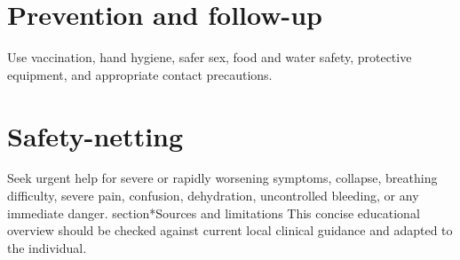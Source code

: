 \section*{Prevention and follow-up}
Use vaccination, hand hygiene, safer sex, food and water safety, protective equipment, and appropriate contact precautions.
\section*{Safety-netting}
Seek urgent help for severe or rapidly worsening symptoms, collapse, breathing difficulty, severe pain, confusion, dehydration, uncontrolled bleeding, or any immediate danger.
section*{Sources and limitations}
This concise educational overview should be checked against current local clinical guidance and adapted to the individual.
